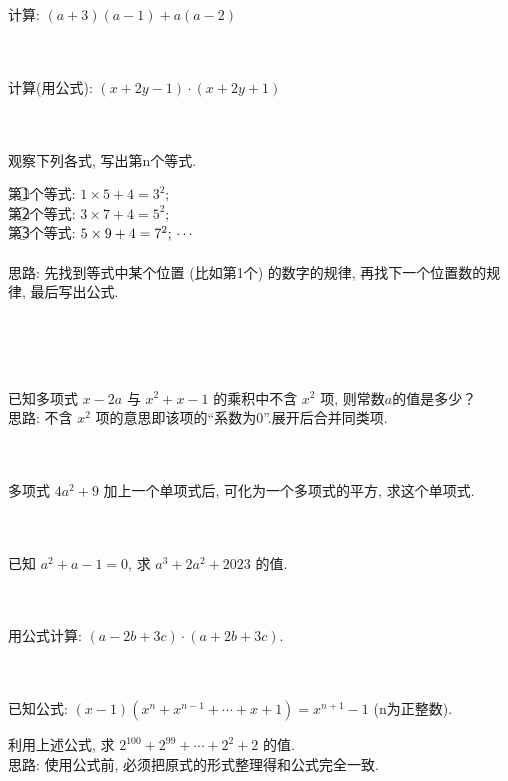 \item{
    计算: $(a+3)(a-1) + a(a-2)$
}
\\ \\ \\

\item{
    计算(用公式): $(x+2y-1)\cdot (x+2y+1)$
}
\\ \\ \\

\item{
    观察下列各式, 写出第n个等式.

    第\textcircled{1}个等式: $1\times 5 + 4 = 3^2;$ \\
    第\textcircled{2}个等式: $3\times 7 + 4 = 5^2;$ \\
    第\textcircled{3}个等式: $5\times 9 + 4 = 7^2; \\ \cdots $ \\
    \ifshowSolution
    \fangsong{}
    \\
    思路: 先找到等式中某个位置 (比如第1个) 的数字的规律, 再找下一个位置数的规律, 最后写出公式.
    \fi
}
\\ \\ \\

\item{
    已知多项式 $x-2a$ 与 $x^2+x-1$ 的乘积中不含 $x^2$ 项, 则常数$a$的值是多少？
    \ifshowSolution
    \fangsong{}
    \\
    思路: 不含 $x^2$ 项的意思即该项的“系数为0”.展开后合并同类项.
    \fi
}
\\ \\ \\

\item{
    多项式 $4a^2+9$ 加上一个单项式后, 可化为一个多项式的平方, 求这个单项式.
}
\\ \\ \\

\item{
    已知 $a^2+a-1=0$, 求 $a^3 + 2a^2 + 2023$ 的值.
}
\\ \\ \\

\item{
    用公式计算: $(a-2b+3c)\cdot (a+2b+3c)$.
}
\\ \\ \\

\item{
    已知公式: $(x-1)(x^n + x^{n-1} + \cdots + x + 1) = x^{n+1} - 1$ (n为正整数).
    
    利用上述公式, 求 $2^{100} + 2^{99} +\cdots + 2^2 + 2$ 的值.
    \ifshowSolution
    \fangsong{}
    \\
    思路: 使用公式前, 必须把原式的形式整理得和公式完全一致.
    \fi
}
\\ \\ \\